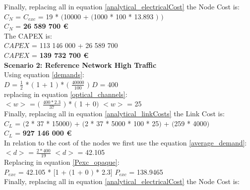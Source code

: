 Finally, replacing all in equation \ref{analytical_electricalCost} the Node Cost is:\\

$C_N$ = $C_{exc}$ = 19 * $($10000 + $($1000 * 100 * 13.893 $)$ $)$\\

$C_N$ = \textbf{26 589 700 \euro}\\

The CAPEX is:\\
$CAPEX$ = 113 146 000 + 26 589 700\\

$CAPEX$ = \textbf{139 732 700 \euro}\\

\textbf{Scenario 2: Reference Network High Traffic}\\

Using equation \ref{demands}:\\

$D$ = $\frac{1}{2}$ * $($ 1 + 1 $)$ * $($ $\frac{40000}{100}$ $)$ \qquad \qquad $D$ = 400\\

replacing in equation \ref{optical_channels}:\\

$<w>$ = $($ $\frac{400 * 2.3}{37}$ $)$ * $($ 1 + 0$)$ \qquad \quad $<w>$ = 25\\

Finally, replacing all in equation \ref{analytical_linkCosts} the Link Cost is:\\

$C_L$ = $($2 * 37 * 15000$)$ + $($2 * 37 * 5000 * 100 * 25$)$ + $($259 * 4000$)$\\

$C_L$ = \textbf{927 146 000 \euro}\\

In relation to the cost of the nodes we first use the equation \ref{average_demand}:\\

$<d>$ = $\frac{2 * 400}{19}$ \qquad \qquad $<d>$ = 42.105\\

Replacing in equation \ref{Pexc_opaque}:\\

$P_{exc}$ = 42.105 * $[$1 + $($1 + $0$ $)$ * 2.3$]$ \qquad \qquad $P_{exc}$ = 138.9465 \\

Finally, replacing all in equation \ref{analytical_electricalCost} the Node Cost is:\\

